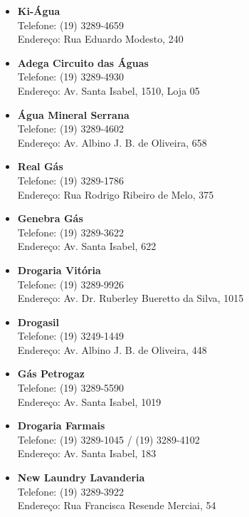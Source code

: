 \begin{itemize}
    \item  \textbf{Ki-Água}
        \\Telefone: (19) 3289-4659
        \\Endereço: Rua Eduardo Modesto, 240

    \item  \textbf{Adega Circuito das Águas}
        \\Telefone: (19) 3289-4930
        \\Endereço: Av. Santa Isabel, 1510, Loja 05

    \item  \textbf{Água Mineral Serrana}
        \\Telefone: (19) 3289-4602
        \\Endereço: Av. Albino J. B. de Oliveira, 658

    \item  \textbf{Real Gás}
        \\Telefone: (19) 3289-1786
        \\Endereço: Rua Rodrigo Ribeiro de Melo, 375

    \item  \textbf{Genebra Gás}
        \\Telefone: (19) 3289-3622
        \\Endereço: Av. Santa Isabel, 622

    \item  \textbf{Drogaria Vitória}
        \\Telefone: (19) 3289-9926
        \\Endereço: Av. Dr. Ruberley Bueretto da Silva, 1015

    \item  \textbf{Drogasil}
        \\Telefone: (19) 3249-1449
        \\Endereço: Av. Albino J. B. de Oliveira, 448

    \item  \textbf{Gás Petrogaz}
         \\Telefone: (19) 3289-5590
         \\Endereço: Av. Santa Isabel, 1019

    \item  \textbf{Drogaria Farmais}
         \\Telefone: (19) 3289-1045 / (19) 3289-4102
         \\Endereço: Av. Santa Isabel, 183

    \item  \textbf{New Laundry Lavanderia}
        \\Telefone: (19) 3289-3922
        \\Endereço: Rua Francisca Resende Merciai, 54


\end{itemize}
